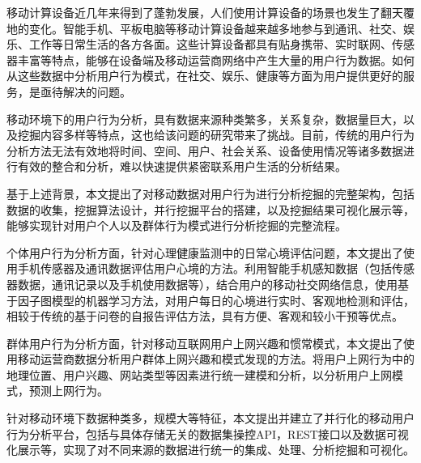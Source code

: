 \begin{cabstract}
  移动计算设备近几年来得到了蓬勃发展，人们使用计算设备的场景也发生了翻天覆地的变化。智能手机、平板电脑等移动计算设备越来越多地参与到通讯、社交、娱乐、工作等日常生活的各方各面。这些计算设备都具有贴身携带、实时联网、传感器丰富等特点，能够在设备端及移动运营商网络中产生大量的用户行为数据。如何从这些数据中分析用户行为模式，在社交、娱乐、健康等方面为用户提供更好的服务，是亟待解决的问题。
  
  移动环境下的用户行为分析，具有数据来源种类繁多，关系复杂，数据量巨大，以及挖掘内容多样等特点，这也给该问题的研究带来了挑战。目前，传统的用户行为分析方法无法有效地将时间、空间、用户、社会关系、设备使用情况等诸多数据进行有效的整合和分析，难以快速提供紧密联系用户生活的分析结果。

  基于上述背景，本文提出了对移动数据对用户行为进行分析挖掘的完整架构，包括数据的收集，挖掘算法设计，并行挖掘平台的搭建，以及挖掘结果可视化展示等，能够实现针对用户个人以及群体行为模式进行分析挖掘的完整流程。

  个体用户行为分析方面，针对心理健康监测中的日常心境评估问题，本文提出了使用手机传感器及通讯数据评估用户心境的方法。利用智能手机感知数据（包括传感器数据，通讯记录以及手机使用数据等），结合用户的移动社交网络信息，使用基于因子图模型的机器学习方法，对用户每日的心境进行实时、客观地检测和评估，相较于传统的基于问卷的自报告评估方法，具有方便、客观和较小干预等优点。

  群体用户行为分析方面，针对移动互联网用户上网兴趣和惯常模式，本文提出了使用移动运营商数据分析用户群体上网兴趣和模式发现的方法。将用户上网行为中的地理位置、用户兴趣、网站类型等因素进行统一建模和分析，以分析用户上网模式，预测上网行为。

  针对移动环境下数据种类多，规模大等特征，本文提出并建立了并行化的移动用户行为分析平台，包括与具体存储无关的数据集操控API，REST接口以及数据可视化展示等，实现了对不同来源的数据进行统一的集成、处理、分析挖掘和可视化。

\end{cabstract}


